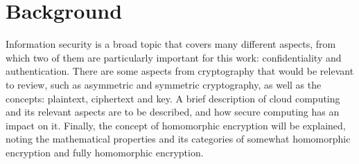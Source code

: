 \chapter{Background}
\label{background}

Information security is a broad topic that covers many different aspects, from which two of them are particularly important for this work: confidentiality and authentication. There are some aspects from cryptography that would be relevant to review, such as asymmetric and symmetric cryptography, as well as the concepts: plaintext, ciphertext and key. A brief description of cloud computing and its relevant aspects are to be described, and how secure computing has an impact on it. Finally, the concept of homomorphic encryption will be explained, noting the mathematical properties and its categories of somewhat homomorphic encryption and fully homomorphic encryption.


\clearpage
